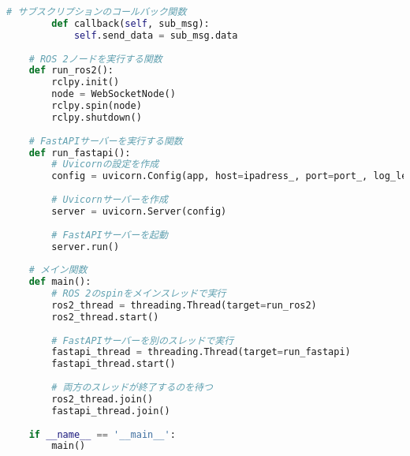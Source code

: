 \begin{lstlisting}[language=Python, caption=web\_socket\_node.py]
        # サブスクリプションのコールバック関数
        def callback(self, sub_msg):
            self.send_data = sub_msg.data
    
    # ROS 2ノードを実行する関数
    def run_ros2():
        rclpy.init()
        node = WebSocketNode()
        rclpy.spin(node)
        rclpy.shutdown()
    
    # FastAPIサーバーを実行する関数
    def run_fastapi():
        # Uvicornの設定を作成
        config = uvicorn.Config(app, host=ipadress_, port=port_, log_level="info")
    
        # Uvicornサーバーを作成
        server = uvicorn.Server(config)
    
        # FastAPIサーバーを起動
        server.run()
    
    # メイン関数
    def main():
        # ROS 2のspinをメインスレッドで実行
        ros2_thread = threading.Thread(target=run_ros2)
        ros2_thread.start()
    
        # FastAPIサーバーを別のスレッドで実行
        fastapi_thread = threading.Thread(target=run_fastapi)
        fastapi_thread.start()
    
        # 両方のスレッドが終了するのを待つ
        ros2_thread.join()
        fastapi_thread.join()
    
    if __name__ == '__main__':
        main()
\end{lstlisting}


